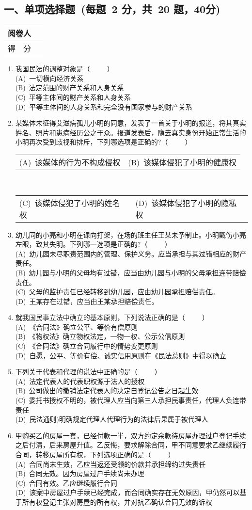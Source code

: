 \documentclass[twocolumn,landscape,UTF8]{ctexart}
\makeatletter
\newcommand{\twoch}[4]{\\\begin{tabular}{*{2}{@{}p{7cm}}}(A)~#1 & (B)~#2\end{tabular}\\\begin{tabular}{*{2}{@{}p{7cm}}}(C)~#3 &
		(D)~#4\end{tabular}}  %
\newcommand{\onech}[4]{\\(A)~#1 \\ (B)~#2 \\ (C)~#3 \\ (D)~#4}  %
\makeatother
\begin{document}
	\begin{spacing}{1.3}
		
		\section*{\hspace{5cm} 一、单项选择题~(每题~2 分，共~20 题，40分)}
		\vspace{-2cm}
		\begin{tabular}{|p{}|p{}|}
			\hline
			\centering 阅卷人& \\
			\hline
			\centering 得~~分 &  \\
			\hline
		\end{tabular}
		
\begin{enumerate}\setcounter{enumi}{0}

\item 我国民法的调整对象是（~~~~~）
\onech{一切横向经济关系}{法定范围的财产关系和人身关系}{平等主体间的财产关系和人身关系}{平等主体间的人身关系和完全没有国家参与的财产关系}
\item 某媒体未征得艾滋病孤儿小明的同意，发表了一首关于小明的报道，将其真实姓名、照片和患病经历公之于众。报道发表后，隐去真实身份开始正常生活的小明再次受到歧视和排斥，下列哪选项是正确的?（~~~~~）
\twoch{该媒体的行为不构成侵权}{该媒体侵犯了小明的健康权}{该媒体侵犯了小明的姓名权}{该媒体侵犯了小明的隐私权}
\item 幼儿同的小亮和小明在课向打架，在场的班主任王某未予制止。小明戳伤小亮左眼，致其失明。下列哪一选项是正确的?（~~~~~）
\onech{幼儿园未尽职责范围内的管理、保护义务。应当承担与其过错相应的财产责任。}{幼儿园与小明的父母均有过错，应当由幼儿园与小明的父母承担连带赔偿责任。}{父母的监护责任已经转移到幼儿园，应由幼儿园承担赔偿责任。}{王某存在过错，应当由王某承担赔偿责任。}
\item 就我国民事立法中确立的基本原则，下列说法正确的是（~~~~~）
\onech{《合同法》确立公平、等价有偿原则}{《物权法》确立物权法定，一物一权、公示公信原则}{《合同法》确立合同履行中的情势变更原则}{自愿，公平、等价有偿、诚实信用原则在《民法总则》中得以确立}
\item 下列关于代表和代理的说法中正确的是（~~~~~）
\onech{法定代表人的代表职权源于法人的授权}{公司做出的撤销法定代表人的决定自登记公告之日起生效}{委托书授权不明的，被代理人应当向第三人承担民事责任，代理人负连带责任}{民法通则)明确规定代理人代理行为的法律后果属于被代理人}
\item 甲购买乙的房屋一套，已经付款一半，双方约定余款待房屋办理过户登记手续之后付清，后来房屋升值。乙反悔，要求解除合同，甲不同意要求乙继续履行合同，转移房屋所有权，下列选项正确的是（~~~~~）
\onech{合同尚末生效，乙应当返还受领的价款并承担缔约过失责任}{合同无效。因为房屋过户手续尚未办理}{合同有效。乙应继续履行合同}{该案中房屋过户手续已经完成，而合同确实存在无效原因，甲仍然可以基于所有权登记主张对房屋的所有权，并对抗乙确认合同无效的诉权}



\end{enumerate}
\end{spacing}
\end{document}
